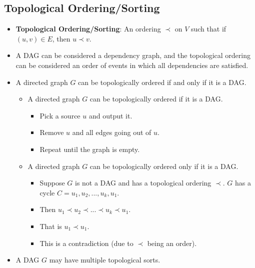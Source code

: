 \documentclass[12pt]{article}
\begin{document}
\subsection{Topological Ordering/Sorting}
\begin{itemize}
    \item \textbf{Topological Ordering/Sorting}: An ordering $\prec$ on $V$ such that if $(u, v) \in E$, then $u \prec v$.
    \item A DAG can be considered a dependency graph, and the topological ordering can be considered an order of events in which all dependencies are satisfied.
    \item A directed graph $G$ can be topologically ordered if and only if it is a DAG.
    \begin{itemize}
        \item A directed graph $G$ can be topologically ordered if it is a DAG.
        \begin{itemize}
            \item Pick a source $u$ and output it.
            \item Remove $u$ and all edges going out of $u$.
            \item Repeat until the graph is empty.
        \end{itemize}
        \item A directed graph $G$ can be topologically ordered only if it is a DAG.
        \begin{itemize}
            \item Suppose $G$ is not a DAG and has a topological ordering $\prec$. $G$ has a cycle $C = u_1, u_2, ..., u_k, u_1$.
            \item Then $u_1 \prec u_2 \prec ... \prec u_k \prec u_1$.
            \item That is $u_1 \prec u_1$.
            \item This is a contradiction (due to $\prec$ being an order).
        \end{itemize}
    \end{itemize}
    \item A DAG $G$ may have multiple topological sorts.
\end{itemize}
\end{document}
